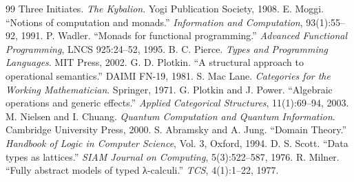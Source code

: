 \documentclass[11pt,twoside,openright]{book}
\theoremstyle{definition}
\theoremstyle{plain}
\theoremstyle{remark}
\begin{document}
\begin{thebibliography}{99}
 Three Initiates. \textit{The Kybalion}. Yogi Publication Society, 1908.
 E. Moggi. ``Notions of computation and monads.'' \textit{Information and Computation}, 93(1):55--92, 1991.
 P. Wadler. ``Monads for functional programming.'' \textit{Advanced Functional Programming}, LNCS 925:24--52, 1995.
 B. C. Pierce. \textit{Types and Programming Languages}. MIT Press, 2002.
 G. D. Plotkin. ``A structural approach to operational semantics.'' DAIMI FN-19, 1981.
 S. Mac Lane. \textit{Categories for the Working Mathematician}. Springer, 1971.
 G. Plotkin and J. Power. ``Algebraic operations and generic effects.'' \textit{Applied Categorical Structures}, 11(1):69--94, 2003.
 M. Nielsen and I. Chuang. \textit{Quantum Computation and Quantum Information}. Cambridge University Press, 2000.
 S. Abramsky and A. Jung. ``Domain Theory.'' \textit{Handbook of Logic in Computer Science}, Vol. 3, Oxford, 1994.
 D. S. Scott. ``Data types as lattices.'' \textit{SIAM Journal on Computing}, 5(3):522--587, 1976.
 R. Milner. ``Fully abstract models of typed λ-calculi.'' \textit{TCS}, 4(1):1--22, 1977.
\end{thebibliography}
\end{document}
